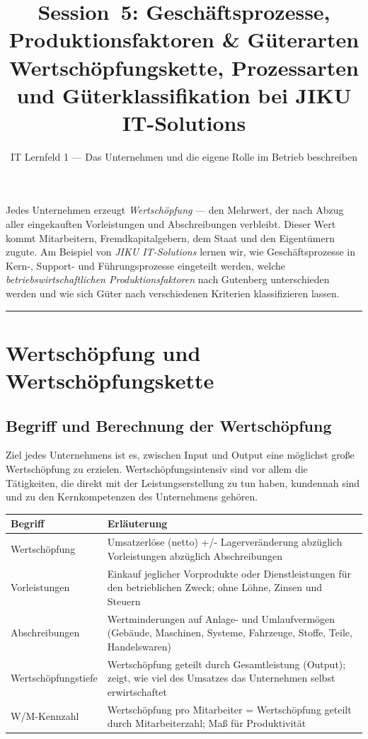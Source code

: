 \documentclass[11pt, a4paper]{article}
\title{\vspace*{-1.5cm}\Huge\bfseries\color{bfwPrimaryDark}Session~5: Geschäftsprozesse, Produktionsfaktoren \& Güterarten\\[0.4em]
  \large\color{bfwInkSoft}\textnormal{Wertschöpfungskette, Prozessarten und Güterklassifikation bei JIKU IT-Solutions}}
\author{\textsf{IT Lernfeld 1 --- Das Unternehmen und die eigene Rolle im Betrieb beschreiben}}
\date{}
\begin{document}
\maketitle
\thispagestyle{empty}

\vspace{1em}
\begin{merksatz}[title={\bfseries Worum geht es in dieser Session?}]
Jedes Unternehmen erzeugt \emph{Wertschöpfung} --- den Mehrwert, der nach Abzug aller
eingekauften Vorleistungen und Abschreibungen verbleibt. Dieser Wert kommt Mitarbeitern,
Fremdkapitalgebern, dem Staat und den Eigentümern zugute. Am Beispiel von \emph{JIKU
IT-Solutions} lernen wir, wie Geschäftsprozesse in Kern-, Support- und Führungsprozesse
eingeteilt werden, welche \emph{betriebswirtschaftlichen Produktionsfaktoren} nach Gutenberg
unterschieden werden und wie sich Güter nach verschiedenen Kriterien klassifizieren lassen.
\end{merksatz}

\tableofcontents
\vspace{1em}
\hrule
\vspace{1em}

\section{Wertschöpfung und Wertschöpfungskette}

\subsection{Begriff und Berechnung der Wertschöpfung}

Ziel jedes Unternehmens ist es, zwischen Input und Output eine möglichst große Wertschöpfung
zu erzielen. Wertschöpfungsintensiv sind vor allem die Tätigkeiten, die direkt mit der
Leistungserstellung zu tun haben, kundennah sind und zu den Kernkompetenzen des Unternehmens
gehören.

\begin{center}
\begin{tabular}{p{4cm} p{9cm}}
\toprule
\textbf{Begriff} & \textbf{Erläuterung}\\
\midrule
Wertschöpfung & Umsatzerlöse (netto) +/- Lagerveränderung abzüglich Vorleistungen abzüglich Abschreibungen\\
\addlinespace
Vorleistungen & Einkauf jeglicher Vorprodukte oder Dienstleistungen für den betrieblichen Zweck; ohne Löhne, Zinsen und Steuern\\
\addlinespace
Abschreibungen & Wertminderungen auf Anlage- und Umlaufvermögen (Gebäude, Maschinen, Systeme, Fahrzeuge, Stoffe, Teile, Handelswaren)\\
\addlinespace
Wertschöpfungstiefe & Wertschöpfung geteilt durch Gesamtleistung (Output); zeigt, wie viel des Umsatzes das Unternehmen selbst erwirtschaftet\\
\addlinespace
W/M-Kennzahl & Wertschöpfung pro Mitarbeiter = Wertschöpfung geteilt durch Mitarbeiterzahl; Maß für Produktivität\\
\bottomrule
\end{tabular}
\end{center}
\end{document}
